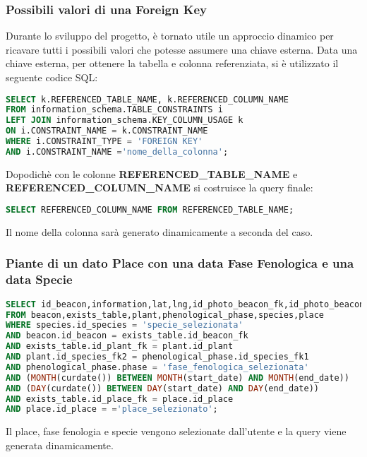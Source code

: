 \subsubsection{Possibili valori di una Foreign Key}
Durante lo sviluppo del progetto, è tornato utile un approccio dinamico per ricavare tutti i possibili valori che potesse assumere una chiave esterna.
Data una chiave esterna, per ottenere la tabella e colonna referenziata, si è utilizzato il seguente codice SQL:
\begin{lstlisting}[language=SQL]
SELECT k.REFERENCED_TABLE_NAME, k.REFERENCED_COLUMN_NAME
FROM information_schema.TABLE_CONSTRAINTS i 
LEFT JOIN information_schema.KEY_COLUMN_USAGE k 
ON i.CONSTRAINT_NAME = k.CONSTRAINT_NAME 
WHERE i.CONSTRAINT_TYPE = 'FOREIGN KEY' 
AND i.CONSTRAINT_NAME ='nome_della_colonna'; 
\end{lstlisting}
Dopodichè con le colonne \textbf{REFERENCED\_TABLE\_NAME} e \newline \textbf{REFERENCED\_COLUMN\_NAME} si costruisce la query finale:
\begin{lstlisting}[language=SQL]
SELECT REFERENCED_COLUMN_NAME FROM REFERENCED_TABLE_NAME;
\end{lstlisting}
Il nome della colonna sarà generato dinamicamente a seconda del caso.

\subsubsection{Piante di un dato Place con una data Fase Fenologica e una data Specie}

\begin{lstlisting}[language=SQL]
SELECT id_beacon,information,lat,lng,id_photo_beacon_fk,id_photo_beacon_shadow_fk 
FROM beacon,exists_table,plant,phenological_phase,species,place
WHERE species.id_species = 'specie_selezionata' 
AND beacon.id_beacon = exists_table.id_beacon_fk 
AND exists_table.id_plant_fk = plant.id_plant 
AND plant.id_species_fk2 = phenological_phase.id_species_fk1 
AND phenological_phase.phase = 'fase_fenologica_selezionata' 
AND (MONTH(curdate()) BETWEEN MONTH(start_date) AND MONTH(end_date)) 
AND (DAY(curdate()) BETWEEN DAY(start_date) AND DAY(end_date))
AND exists_table.id_place_fk = place.id_place 
AND place.id_place = ='place_selezionato';
\end{lstlisting}
Il place, fase fenologia e specie vengono selezionate dall'utente e la query viene generata dinamicamente.

\newpage

